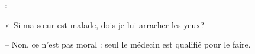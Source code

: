 



    	





  :

  «~Si ma sœur est malade, dois-je lui arracher les yeux?
  
  -- Non, ce n’est pas moral : seul le médecin est qualifié pour le faire.
  
